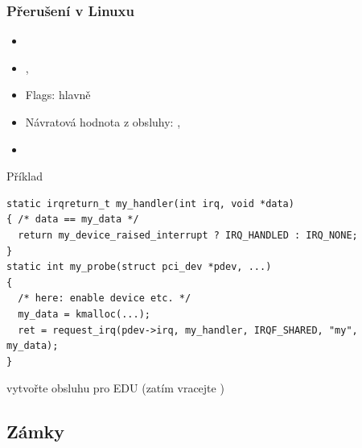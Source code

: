 \begin{frame}[fragile]
  \frametitle{Přerušení v Linuxu}

  \begin{itemize}
  \item {}
  \item {}, 
  \item Flags: hlavně 
  \item Návratová hodnota z obsluhy: , 
  \item {}
  \end{itemize}

  \begin{block}{Příklad}
  \begin{lstlisting}
static irqreturn_t my_handler(int irq, void *data)
{ /* data == my_data */
  return my_device_raised_interrupt ? IRQ_HANDLED : IRQ_NONE;
}
static int my_probe(struct pci_dev *pdev, ...)
{
  /* here: enable device etc. */
  my_data = kmalloc(...);
  ret = request_irq(pdev->irq, my_handler, IRQF_SHARED, "my", my_data);
}
  \end{lstlisting}
  \end{block}

  \pause

   vytvořte obsluhu pro EDU (zatím vracejte )

\end{frame}


\iffimuni
\subsection{Zámky}
\fi

